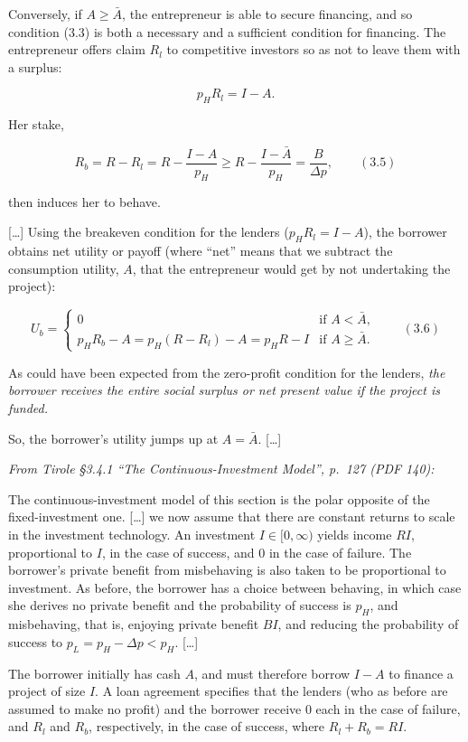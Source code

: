 \documentclass[11pt,a4paper]{article}
\begin{document}
Conversely, if \(A \geqslant \bar A\), the entrepreneur is able to secure financing, and so
condition (3.3) is both a necessary and a sufficient condition for financing. The entrepreneur
offers claim \(R_l\) to competitive investors so as not to leave them with a surplus:

\[p_H R_l = I - A.\]

Her stake,

\[R_b = R - R_l = R - \frac{I - A}{p_H} \geqslant R - \frac{I - \bar A}{p_H} = \frac{B}{\Delta p}, \qquad (3.5)\]

then induces her to behave.

{[}\ldots{]} Using the breakeven condition for the lenders (\(p_H R_l = I - A\)), the borrower
obtains net utility or payoff (where ``net'' means that we subtract the consumption utility, \(A\),
that the entrepreneur would get by not undertaking the project):

\[U_b = \begin{cases} 0 & \text{if } A < \bar A, \\ p_H R_b - A = p_H(R - R_l) - A = p_H R - I & \text{if } A \geqslant \bar A. \end{cases} \qquad (3.6)\]

As could have been expected from the zero-profit condition for the lenders, \emph{the borrower
receives the entire social surplus or net present value if the project is funded.}

So, the borrower's utility jumps up at \(A = \bar A\). {[}\ldots{]}

\emph{From Tirole §3.4.1 ``The Continuous-Investment Model'', p.~127 (PDF 140):}

The continuous-investment model of this section is the polar opposite of the fixed-investment one.
{[}\ldots{]} we now assume that there are constant returns to scale in the investment technology. An
investment \(I \in [0, \infty)\) yields income \(RI\), proportional to \(I\), in the case of
success, and 0 in the case of failure. The borrower's private benefit from misbehaving is also taken
to be proportional to investment. As before, the borrower has a choice between behaving, in which
case she derives no private benefit and the probability of success is \(p_H\), and misbehaving, that
is, enjoying private benefit \(BI\), and reducing the probability of success to
\(p_L = p_H - \Delta p < p_H\). {[}\ldots{]}

The borrower initially has cash \(A\), and must therefore borrow \(I - A\) to finance a project of
size \(I\). A loan agreement specifies that the lenders (who as before are assumed to make no
profit) and the borrower receive 0 each in the case of failure, and \(R_l\) and \(R_b\),
respectively, in the case of success, where \(R_l + R_b = RI\).
\end{document}
